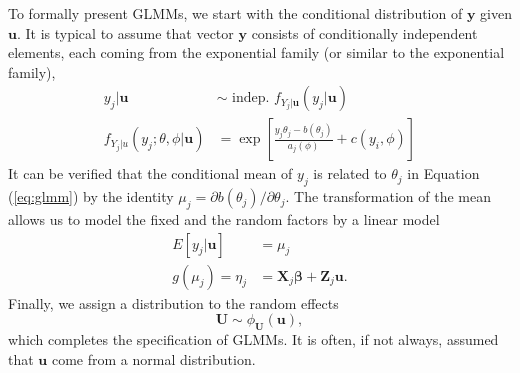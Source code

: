 To formally present GLMMs, we start with the conditional distribution of $\bm y$ given $\bm u$. It
is typical to assume that vector $\bm y$ consists of conditionally independent elements, each coming
from the exponential family (or similar to the exponential family), 
\begin{equation}\label{eq:glmm}
	\begin{split}
		y_j|\bm u & \sim \text{~indep.~} f_{Y_j |\bm u} (y_j|\bm u) \\
		f_{Y_j|u}(y_j; \theta, \phi|\bm u) &= \exp \left[ \frac{y_j\theta_j	 -b(\theta_j)}{a_j(\phi)}
		+ c(y_i, \phi)\right]
	\end{split}
\end{equation}	
It can be verified that the conditional mean of $y_j$ is related to $\theta_j$ in Equation
(\ref{eq:glmm}) by the identity $\mu_j = \partial b(\theta_j)/\partial \theta_j$. The transformation
of the mean allows us to model the fixed and the random factors by a linear model
\begin{equation}\label{eq:glmm2}
	\begin{split}
		E[y_j|\bm u] &= \mu_j\\
		g(\mu_j) = \eta_j &= \bm X_j\bm \beta + \bm Z_j\bm u.
	\end{split}
\end{equation}
Finally, we assign a distribution to the random effects
\begin{equation}
	\bm U \sim \phi_{\bm U}(\bm u),
\end{equation}
which completes the specification of GLMMs. It is often, if not always, assumed that $\bm u$ come
from a normal distribution.

